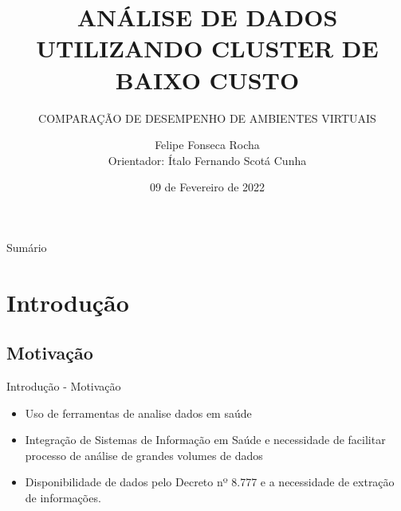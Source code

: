 \documentclass[10pt,brazil]{beamer}
\theoremstyle{definition}
\begin{document}

\title[]{ANÁLISE DE DADOS UTILIZANDO CLUSTER DE BAIXO CUSTO}
\subtitle{COMPARAÇÃO DE DESEMPENHO DE AMBIENTES VIRTUAIS}


\author[Felipe Rocha]{Felipe Fonseca Rocha \\
  \vspace{0.25cm}
  Orientador: Ítalo Fernando Scotá Cunha }
\date{09 de Fevereiro de 2022}

\AtBeginSection{%
  \begin{frame}
    \tableofcontents[currentsection, subsectionstyle=show/show/hide]
  \end{frame}
}
\frame{\maketitle}


\begin{frame}{Sumário}
  \tableofcontents[hideallsubsections]
\end{frame}


%
%

\section{Introdução}

\subsection{Motivação}

\begin{frame}{Introdução - Motivação}
  \begin{itemize}[]
    \item Uso de ferramentas de analise dados em saúde 
    \item Integração de Sistemas de Informação em Saúde e necessidade de facilitar processo de análise de grandes volumes de dados 
    \item Disponibilidade de dados pelo Decreto nº 8.777 e a necessidade de extração de informações.
  \end{itemize}
\end{frame}
\end{document}
